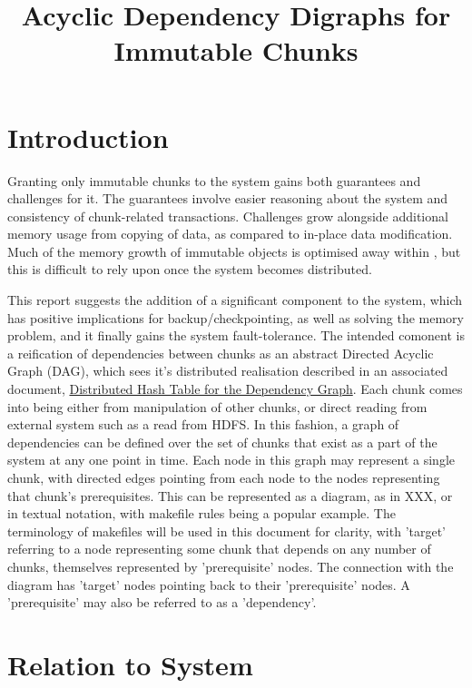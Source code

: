\documentclass[10pt, a4paper]{article}
\begin{document}
\title{Acyclic Dependency Digraphs for Immutable Chunks}
  
\maketitle

\section{Introduction}
Granting only immutable chunks to the \lsr{} system gains both guarantees and challenges for it.
The guarantees involve easier reasoning about the system and consistency of chunk-related transactions.
Challenges grow alongside additional memory usage from copying of data, as compared to in-place data modification.
Much of the memory growth of immutable objects is optimised away within \R{}, but this is difficult to rely upon once the system becomes distributed.

This report suggests the addition of a significant component to the \lsr{} system, which has positive implications for backup/checkpointing, as well as solving the memory problem, and it finally gains the system fault-tolerance.
The intended comonent is a reification of dependencies between chunks as an abstract Directed Acyclic Graph (DAG), which sees it's distributed realisation described in an associated document, \href{https://www.japeca.com/dhtinfo.pdf}{Distributed Hash Table for the Dependency Graph}.
Each chunk comes into being either from manipulation of other chunks, or direct reading from external system such as a read from HDFS.
In this fashion, a graph of dependencies can be defined over the set of chunks that exist as a part of the system at any one point in time.
Each node in this graph may represent a single chunk, with directed edges pointing from each node to the nodes representing that chunk's prerequisites.
This can be represented as a diagram, as in XXX, or in textual notation, with makefile rules being a popular example.
The terminology of makefiles will be used in this document for clarity, with 'target' referring to a node representing some chunk that depends on any number of chunks, themselves represented by 'prerequisite' nodes. 
The connection with the diagram has 'target' nodes pointing back to their 'prerequisite' nodes.
A 'prerequisite' may also be referred to as a 'dependency'.

\section{Relation to System}
\end{document}
